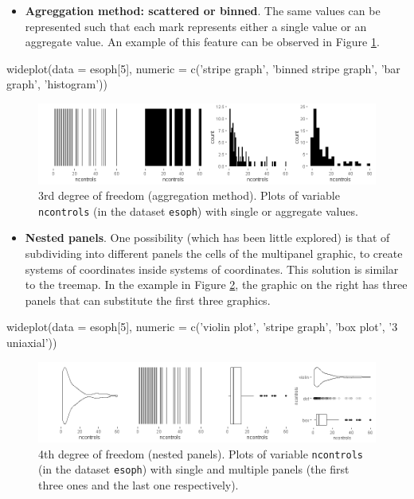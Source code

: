 \begin{itemize}
	\tightlist
	\item
	\textbf{Agreggation method: scattered or binned}. The same values can
	be represented such that each mark represents either a single value or
	an aggregate value. An example of this feature can be observed in
	Figure \ref{fig:dg2}.
\end{itemize}

\begin{example}
  wideplot(data = esoph[5], 
           numeric = c('stripe graph', 'binned stripe graph', 'bar graph', 
                       'histogram'))
\end{example}

\begin{Schunk}
	\begin{figure}[H]
\includegraphics[width=1\linewidth]{figures/dg2-1} \caption[3rd deg]{3rd degree of freedom (aggregation method). Plots of variable \texttt{ncontrols} (in the dataset \texttt{esoph}) with single or aggregate values.}\label{fig:dg2}
	\end{figure}
\end{Schunk}

\begin{itemize}
	\tightlist
	\item
	\textbf{Nested panels}. One possibility (which has been little
	explored) is that of subdividing into different panels the cells of
	the multipanel graphic, to create systems of coordinates inside
	systems of coordinates. This solution is similar to the treemap. In
	the example in Figure \ref{fig:dg3}, the graphic on the right has
	three panels that can substitute the first three graphics.
\end{itemize}

\begin{example}
  wideplot(data = esoph[5], 
           numeric = c('violin plot', 'stripe graph', 'box plot', '3 uniaxial'))
\end{example}

\begin{Schunk}
	\begin{figure}[H]
\includegraphics[width=1\linewidth]{figures/dg3-1} \caption[4th deg]{4th degree of freedom (nested panels). Plots of variable \texttt{ncontrols} (in the dataset \texttt{esoph}) with single and multiple panels (the first three ones and the last one respectively).}\label{fig:dg3}
	\end{figure}
\end{Schunk}

